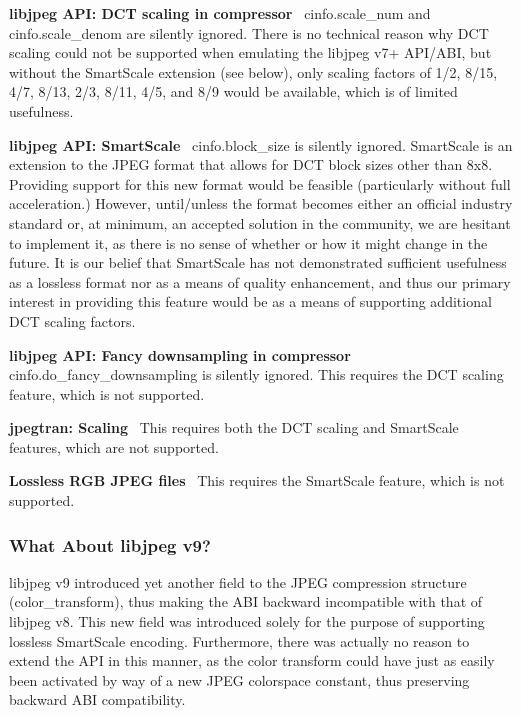 \begin{DoxyItemize}
\item {\bfseries libjpeg A\+PI\+: D\+CT scaling in compressor}~\newline
 {\ttfamily cinfo.\+scale\+\_\+num} and {\ttfamily cinfo.\+scale\+\_\+denom} are silently ignored. There is no technical reason why D\+CT scaling could not be supported when emulating the libjpeg v7+ A\+P\+I/\+A\+BI, but without the Smart\+Scale extension (see below), only scaling factors of 1/2, 8/15, 4/7, 8/13, 2/3, 8/11, 4/5, and 8/9 would be available, which is of limited usefulness.
\item {\bfseries libjpeg A\+PI\+: Smart\+Scale}~\newline
 {\ttfamily cinfo.\+block\+\_\+size} is silently ignored. Smart\+Scale is an extension to the J\+P\+EG format that allows for D\+CT block sizes other than 8x8. Providing support for this new format would be feasible (particularly without full acceleration.) However, until/unless the format becomes either an official industry standard or, at minimum, an accepted solution in the community, we are hesitant to implement it, as there is no sense of whether or how it might change in the future. It is our belief that Smart\+Scale has not demonstrated sufficient usefulness as a lossless format nor as a means of quality enhancement, and thus our primary interest in providing this feature would be as a means of supporting additional D\+CT scaling factors.
\item {\bfseries libjpeg A\+PI\+: Fancy downsampling in compressor}~\newline
 {\ttfamily cinfo.\+do\+\_\+fancy\+\_\+downsampling} is silently ignored. This requires the D\+CT scaling feature, which is not supported.
\item {\bfseries jpegtran\+: Scaling}~\newline
 This requires both the D\+CT scaling and Smart\+Scale features, which are not supported.
\item {\bfseries Lossless R\+GB J\+P\+EG files}~\newline
 This requires the Smart\+Scale feature, which is not supported.
\end{DoxyItemize}

\subsubsection*{What About libjpeg v9?}

libjpeg v9 introduced yet another field to the J\+P\+EG compression structure ({\ttfamily color\+\_\+transform}), thus making the A\+BI backward incompatible with that of libjpeg v8. This new field was introduced solely for the purpose of supporting lossless Smart\+Scale encoding. Furthermore, there was actually no reason to extend the A\+PI in this manner, as the color transform could have just as easily been activated by way of a new J\+P\+EG colorspace constant, thus preserving backward A\+BI compatibility.

